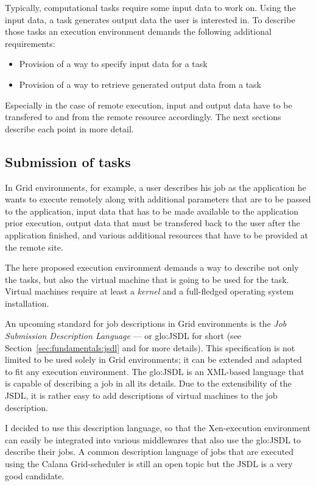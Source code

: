 Typically, computational tasks  require some input data to  work on. Using
the input data, a task generates output data the user is interested in. To
describe  those  tasks  an  execution environment  demands  the  following
additional requirements:
\begin{itemize}
\item Provision of a way to specify input data for a task
\item Provision of a way to retrieve generated output data from a task
\end{itemize}

Especially in the case of remote  execution, input and output data have to
be  transfered to  and  from  the remote  resource  accordingly. The  next
sections describe each point in more detail.

\subsection{Submission of tasks}
\label{sec:req-task-submission}

In  Grid  environments, for  example,  a user  describes  his  job as  the
application he wants to  execute remotely along with additional parameters
that are to be  passed to the application, input data that  has to be made
available to  the application  prior execution, output  data that  must be
transfered back  to the user  after the application finished,  and various
additional resources that have to be provided at the remote site.

The here proposed execution environment demands a way to describe not only
the tasks, but also  the virtual machine that is going to  be used for the
task. Virtual machines require at least a \emph{kernel} and a full-fledged
operating system installation.

An  upcoming standard  for job  descriptions in  Grid environments  is the
\emph{Job Submission Description Language} --- or \gls{glo:JSDL} for short
(see  Section~\ref{sec:fundamentals:jsdl}  and  \cite{jsdl-spec} for  more
details).  This  specification is  not limited to  be used solely  in Grid
environments;  it  can  be  extended  and adapted  to  fit  any  execution
environment.  The \gls{glo:JSDL} is  an XML-based language that is capable
of describing  a job in all its  details. Due to the  extensibility of the
JSDL, it is rather easy to add descriptions of virtual machines to the job
description.

I  decided to  use this  description language,  so that  the Xen-execution
environment can  easily be integrated  into various middlewares  that also
use  the \gls{glo:JSDL}  to  describe their  jobs.   A common  description
language  of jobs  that are  executed using  the Calana  Grid-scheduler is
still an open topic but the JSDL is a very good candidate.

